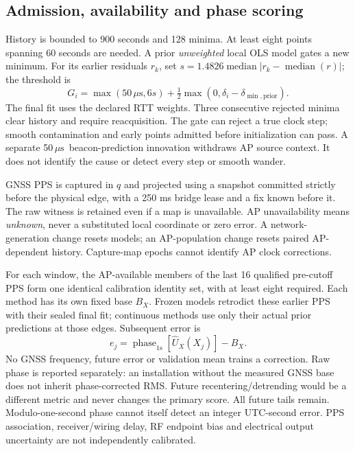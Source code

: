 \documentclass[10pt,letterpaper]{article}
\newcommand{\us}{\ensuremath{\,\mu\mathrm{s}}}
\begin{document}
\subsection{Admission, availability and phase scoring}
History is bounded to 900 seconds and 128 minima. At least eight points spanning
60 seconds are needed. A prior \emph{unweighted} local OLS model gates a new
minimum. For its earlier residuals $r_k$, set
$s=1.4826\operatorname{median}|r_k-\operatorname{median}(r)|$; the threshold is
\begin{equation}
 G_i=\max(50\us,6s)+\tfrac12\max(0,\delta_i-\delta_{\min,\mathrm{prior}}).
\end{equation}
The final fit uses the declared RTT weights. Three consecutive rejected minima
clear history and require reacquisition. The gate can reject a true clock step;
smooth contamination and early points admitted before initialization can pass.
A separate 50\us\ beacon-prediction innovation withdraws AP source context. It
does not identify the cause or detect every step or smooth wander.

GNSS PPS is captured in $q$ and projected using a snapshot committed strictly
before the physical edge, with a 250 ms bridge lease and a fix known before it.
The raw witness is retained even if a map is unavailable. AP unavailability
means \emph{unknown}, never a substituted local coordinate or zero error. A
network-generation change resets models; an AP-population change resets paired
AP-dependent history. Capture-map epochs cannot identify AP clock corrections.

For each window, the AP-available members of the last 16 qualified pre-cutoff
PPS form one identical calibration identity set, with at least eight required.
Each method has its own fixed base $B_X$. Frozen models retrodict these earlier
PPS with their sealed final fit; continuous methods use only their actual prior
predictions at those edges. Subsequent error is
\begin{equation}
 e_j=\operatorname{phase}_{1\mathrm{s}}[\widehat U_X(X_j)]-B_X.
\end{equation}
No GNSS frequency, future error or validation mean trains a correction. Raw
phase is reported separately: an installation without the measured GNSS base
does not inherit phase-corrected RMS. Future recentering/detrending would be a
different metric and never changes the primary score. All future tails remain.
Modulo-one-second phase cannot itself detect an integer
UTC-second error. PPS association, receiver/wiring delay, RF endpoint bias and
electrical output uncertainty are not independently calibrated.
\end{document}
